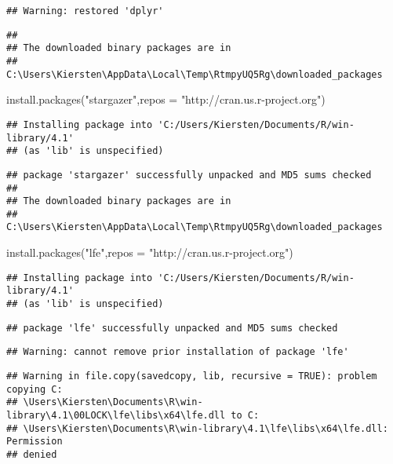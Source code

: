 \documentclass[
]{article}
\newenvironment{Shaded}{\begin{snugshade}}{\end{snugshade}}
\newcommand{\AttributeTok}[1]{\textcolor[rgb]{0.77,0.63,0.00}{#1}}
\newcommand{\FunctionTok}[1]{\textcolor[rgb]{0.00,0.00,0.00}{#1}}
\newcommand{\NormalTok}[1]{#1}
\newcommand{\StringTok}[1]{\textcolor[rgb]{0.31,0.60,0.02}{#1}}
\begin{document}
\begin{verbatim}
## Warning: restored 'dplyr'
\end{verbatim}

\begin{verbatim}
## 
## The downloaded binary packages are in
##  C:\Users\Kiersten\AppData\Local\Temp\RtmpyUQ5Rg\downloaded_packages
\end{verbatim}

\begin{Shaded}
\begin{Highlighting}[]
\FunctionTok{install.packages}\NormalTok{(}\StringTok{"stargazer"}\NormalTok{,}\AttributeTok{repos =} \StringTok{"http://cran.us.r{-}project.org"}\NormalTok{)}
\end{Highlighting}
\end{Shaded}

\begin{verbatim}
## Installing package into 'C:/Users/Kiersten/Documents/R/win-library/4.1'
## (as 'lib' is unspecified)
\end{verbatim}

\begin{verbatim}
## package 'stargazer' successfully unpacked and MD5 sums checked
## 
## The downloaded binary packages are in
##  C:\Users\Kiersten\AppData\Local\Temp\RtmpyUQ5Rg\downloaded_packages
\end{verbatim}

\begin{Shaded}
\begin{Highlighting}[]
\FunctionTok{install.packages}\NormalTok{(}\StringTok{"lfe"}\NormalTok{,}\AttributeTok{repos =} \StringTok{"http://cran.us.r{-}project.org"}\NormalTok{)}
\end{Highlighting}
\end{Shaded}

\begin{verbatim}
## Installing package into 'C:/Users/Kiersten/Documents/R/win-library/4.1'
## (as 'lib' is unspecified)
\end{verbatim}

\begin{verbatim}
## package 'lfe' successfully unpacked and MD5 sums checked
\end{verbatim}

\begin{verbatim}
## Warning: cannot remove prior installation of package 'lfe'
\end{verbatim}

\begin{verbatim}
## Warning in file.copy(savedcopy, lib, recursive = TRUE): problem copying C:
## \Users\Kiersten\Documents\R\win-library\4.1\00LOCK\lfe\libs\x64\lfe.dll to C:
## \Users\Kiersten\Documents\R\win-library\4.1\lfe\libs\x64\lfe.dll: Permission
## denied
\end{verbatim}
\end{document}
